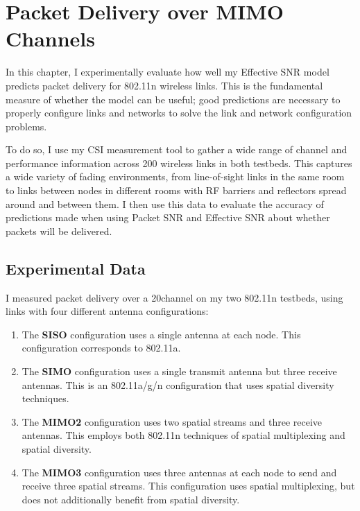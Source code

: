 \ifx\mainfile\undefined

\setcounter{chapter}{5} %
\fi

\cleardoublepage
\chapter{Packet Delivery over MIMO Channels}
\label{chap:delivery}

In this chapter, I experimentally evaluate how well my Effective SNR model predicts packet delivery for 802.11n wireless links. This is the fundamental measure of whether the model can be useful; good predictions are necessary to properly configure links and networks to solve the link and network configuration problems.

To do so, I use my CSI measurement tool to gather a wide range of channel and performance information across 200 wireless links in both testbeds. This captures a wide variety of fading environments, from line-of-sight links in the same room to links between nodes in different rooms with RF barriers and reflectors spread around and between them. I then use this data to evaluate the accuracy of predictions made when using Packet SNR and Effective SNR about whether packets will be delivered.

\section{Experimental Data}
I measured packet delivery over a 20\MHz channel on my two 802.11n testbeds, using links with four different antenna configurations:
\begin{enumerate}
\item The \textbf{SISO} configuration uses a single antenna at each node. This configuration corresponds to 802.11a.
\item The \textbf{SIMO} configuration uses a single transmit antenna but three receive antennas. This is an 802.11a/g/n configuration that uses spatial diversity techniques.
\item The \textbf{MIMO2} configuration uses two spatial streams and three receive antennas. This employs both 802.11n techniques of spatial multiplexing and spatial diversity.
\item The \textbf{MIMO3} configuration uses three antennas at each node to send and receive three spatial streams. This configuration uses spatial multiplexing, but does not additionally benefit from spatial diversity.
\end{enumerate}

